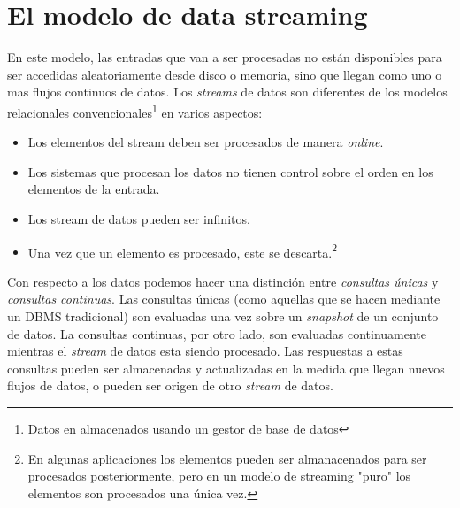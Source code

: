 \documentclass[a4paper,10pt, oneside]{article}
\begin{document}
\section{El modelo de data streaming}

En este modelo, las entradas que van a ser procesadas no están disponibles para ser accedidas aleatoriamente desde disco o memoria, sino que llegan como uno o mas flujos continuos de datos. Los \textit{streams} de datos son diferentes de los modelos relacionales convencionales\footnote{Datos en almacenados usando un gestor de base de datos} en varios aspectos: 
\begin{itemize}
	\item Los elementos del stream deben ser procesados de manera \textit{online}.
	\item Los sistemas que procesan los datos no tienen control sobre el orden en los elementos de la entrada.
	\item Los stream de datos pueden ser infinitos.
	\item Una vez que un elemento es procesado, este se descarta.\footnote{En algunas aplicaciones los elementos pueden ser almanacenados para ser procesados posteriormente, pero en un modelo de streaming "puro" los elementos son procesados una única vez.}
\end{itemize}

Con respecto a los datos podemos hacer una distinción entre \textit{consultas únicas} y \textit{consultas continuas}\cite{Terry:1992:CQO:141484.130333}. Las consultas únicas (como aquellas que se hacen mediante un DBMS tradicional) son evaluadas una vez sobre un \textit{snapshot} de un conjunto de datos. La consultas continuas, por otro lado, son evaluadas continuamente mientras el \textit{stream} de datos esta siendo procesado. Las respuestas a estas consultas pueden ser almacenadas y actualizadas en la medida que llegan nuevos flujos de datos, o pueden ser origen de otro \textit{stream} de datos.
\end{document}
